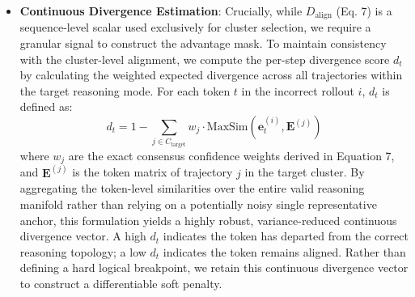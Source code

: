 \documentclass[conference]{IEEEtran}
\begin{document}
\begin{itemize}
    where $w_j = \frac{\exp(-s_j)}{\sum_{k \in C_{\mathrm{target}}} \exp(-s_k)}$, with $s_j = \sum_{k \in C_{\mathrm{target}}} D_{\mathrm{student}}(a^{(j)}, a^{(k)})$. This is computed in log-space to avoid numerical underflow when cluster sizes are large. When $|\mathcal{C}_{\mathrm{target}}| = 1$, the cluster trivially contains a single trajectory and the weight collapses to $w_1 = 1$, reducing the alignment to a direct pairwise comparison. The $M$ reasoning modes are identified using agglomerative hierarchical clustering over the pairwise $D_{\mathrm{student}}$ distance matrix of correct rollouts, with $M$ selected adaptively via a distance threshold $\theta_c$ rather than a fixed count. When only one or two correct rollouts are available (as is common in early training with small $G$), the algorithm naturally produces $M = 1$ or $M = 2$ clusters without instability. By transitioning from a single consensus anchor to a multi cluster valid strategy manifold, our system strictly preserves the multi modal reasoning space. Rare valid strategies form distinct clusters and are never penalized or forced to converge toward a single dominant strategy. This weighted alignment leverages the principle of self consistency, formalizing the framework as self consistency induced process supervision, where the density of the correct reasoning manifold dictates the strength of the alignment target. In cases where no correct rollout exists within the group $G$, the system employs a fallback strategy: it reverts to standard sequence level GRPO penalization for that specific query, bypassing step level masking until the policy explores a correct path.
    \item[] \textbf{Continuous Divergence Estimation}: Crucially, while $D_{\mathrm{align}}$ (Eq. 7) is a sequence-level scalar used exclusively for cluster selection, we require a granular signal to construct the advantage mask. To maintain consistency with the cluster-level alignment, we compute the per-step divergence score $d_t$ by calculating the weighted expected divergence across all trajectories within the target reasoning mode. For each token $t$ in the incorrect rollout $i$, $d_t$ is defined as:
    \begin{equation}
    d_t = 1 - \sum_{j \in C_{\mathrm{target}}} w_j \cdot \mathrm{MaxSim}(\mathbf{e}_t^{(i)}, \mathbf{E}^{(j)})
    \end{equation}
    where $w_j$ are the exact consensus confidence weights derived in Equation 7, and $\mathbf{E}^{(j)}$ is the token matrix of trajectory $j$ in the target cluster. By aggregating the token-level similarities over the entire valid reasoning manifold rather than relying on a potentially noisy single representative anchor, this formulation yields a highly robust, variance-reduced continuous divergence vector. A high $d_t$ indicates the token has departed from the correct reasoning topology; a low $d_t$ indicates the token remains aligned. Rather than defining a hard logical breakpoint, we retain this continuous divergence vector to construct a differentiable soft penalty.
\end{itemize}
\end{document}
